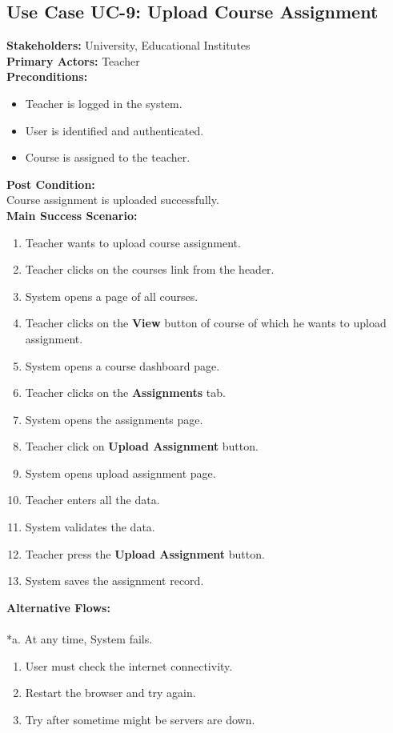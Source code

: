 \subsection{Use Case UC-9: Upload Course Assignment}
\textbf{Stakeholders: } University, Educational Institutes \\
\textbf{Primary Actors: }Teacher \\
\textbf{Preconditions:}
\begin{itemize}
\item Teacher is logged in the system.
\item User is identified and authenticated.
\item Course is assigned to the teacher.
\end{itemize}
\textbf{Post Condition: }\\
Course assignment is uploaded successfully.\\
\textbf{Main Success Scenario:}
\begin{enumerate}
\item Teacher wants to upload course assignment.
\item Teacher clicks on the courses link from the header.
\item System opens a page of all courses.
\item Teacher clicks on the \textbf{View} button of course of which he wants to upload assignment.
\item System opens a course dashboard page.
\item Teacher clicks on the \textbf{Assignments} tab.
\item System opens the assignments page.
\item Teacher click on \textbf{Upload Assignment} button.
\item System opens upload assignment page.
\item Teacher enters all the data.
\item System validates the data.
\item Teacher press the \textbf{Upload Assignment} button.
\item System saves the assignment record.
\end{enumerate}
\textbf{Alternative Flows:}\\
\\
*a. At any time, System fails.
\begin{enumerate}
\item User must check the internet connectivity.
\item Restart the browser and try again.
\item Try after sometime might be servers are down.
\end{enumerate}
